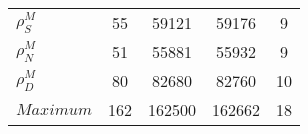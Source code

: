 \begin{center}
\begin{longtable}{lcccc}
$ {\rho^{M}_{S}}       $	 & 	                   55	 & 	                59121	 & 	                59176	 & 	                    9 \\ 
$ {\rho^{M}_{N}}       $	 & 	                   51	 & 	                55881	 & 	                55932	 & 	                    9 \\ 
$ {\rho^{M}_{D}}       $	 & 	                   80	 & 	                82680	 & 	                82760	 & 	                   10 \\ 
$Maximum               $	 & 	                  162	 & 	               162500	 & 	               162662	 & 	                   18 \\ 
\end{longtable}
 \end{center}
